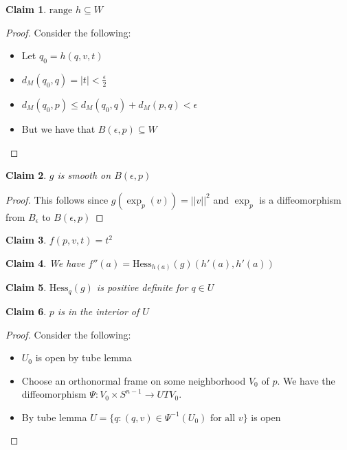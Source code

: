 \documentclass[a4paper,11pt]{article}
\newtheorem{claim}{Claim}
\begin{document}
\begin{claim}
  $\text{range }h \subseteq W$
\end{claim}

\begin{proof}
  Consider the following:
  \begin{itemize}
    \item Let $q_0=h(q,v,t)$
    \item $d_M(q_0,q)=|t|<\frac{\epsilon}{2}$
    \item $d_M(q_0,p) \leq d_M(q_0,q) + d_M(p,q) < \epsilon$
    \item But we have that $B(\epsilon,p) \subseteq W$
  \end{itemize}
\end{proof}

\begin{claim}
  $g$ is smooth on $B(\epsilon,p)$
\end{claim}

\begin{proof}
  This follows since $g(\exp_p(v))=||v||^2$ and $\exp_p$ is a diffeomorphism from $B_\epsilon$ to $B(\epsilon,p)$
\end{proof}

\begin{claim}
  $f(p,v,t)=t^2$
\end{claim}

\begin{claim}
  We have $f''(a)=\text{Hess}_{h(a)}(g)(h'(a),h'(a))$
\end{claim}

\begin{claim}
  $\text{Hess}_q(g)$ is positive definite for $q \in U$
\end{claim}

\begin{claim}
  $p$ is in the interior of $U$
\end{claim}

\begin{proof}
  Consider the following:
  \begin{itemize}
    \item $U_0$ is open by tube lemma
    \item Choose an orthonormal frame on some neighborhood $V_0$ of $p$. We have the diffeomorphism $\Psi:V_0 \times S^{n-1} \to UTV_0$. 
    \item By tube lemma $U=\{q:(q,v) \in \Psi^{-1}(U_0) \text{ for all }v\}$ is open
  \end{itemize}
\end{proof}
\end{document}

